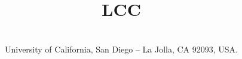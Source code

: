 \documentclass[10pt,twocolumn,letter]{IEEEtran}
\begin{document}
\title{LCC}

\author{\\
University of California, San Diego -- La Jolla, CA 92093, USA.}

\maketitle


\thispagestyle{empty}

%











\end{document}
